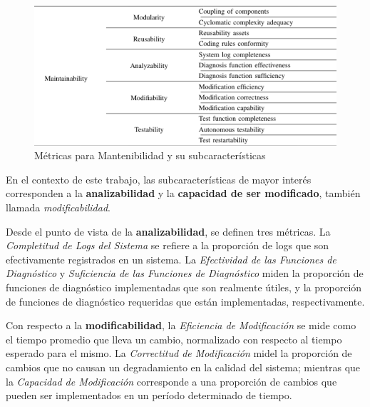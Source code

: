 \begin{figure}[H]
    \label{Metrics}
    \includegraphics[width=12cm]{quality_metrics/quality_metrics.png}
    \centering
    \caption{Métricas para Mantenibilidad y su subcaracterísticas}
\end{figure}

En el contexto de este trabajo, las subcaracterísticas de mayor interés corresponden
a la \textbf{analizabilidad} y la \textbf{capacidad de ser modificado}, también llamada
\textit{modificabilidad}.

Desde el punto de vista de la \textbf{analizabilidad}, se definen tres métricas.
La \textit{Completitud de Logs del Sistema} se refiere a la proporción de logs que son
efectivamente registrados en un sistema.
La \textit{Efectividad de las Funciones de Diagnóstico} y \textit{Suficiencia de las
Funciones de Diagnóstico} miden la proporción de funciones de diagnóstico implementadas que
son realmente útiles, y la proporción de funciones de diagnóstico requeridas que están
implementadas, respectivamente.

Con respecto a la \textbf{modificabilidad}, la \textit{Eficiencia de Modificación} se mide
como el tiempo promedio que lleva un cambio, normalizado con respecto al tiempo esperado
para el mismo.
La \textit{Correctitud de Modificación} midel la proporción de cambios que no causan un
degradamiento en la calidad del sistema; mientras que la \textit{Capacidad de Modificación}
corresponde a una proporción de cambios que pueden ser implementados en un período determinado
de tiempo.

